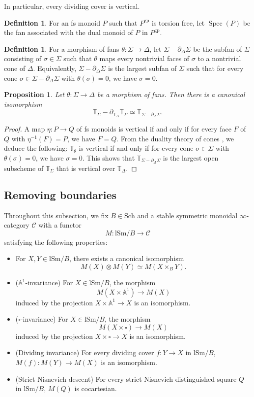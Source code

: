 \documentclass[10pt]{amsart}
\newtheorem{prop}[thm]{Proposition}
\theoremstyle{definition}
\newtheorem{df}[thm]{Definition}
\theoremstyle{remark}
\numberwithin{equation}{subsection}
\newcommand{\A}{\mathbb{A}}
\newcommand{\T}{\mathbb{T}}
\newcommand{\cC}{\mathcal{C}}
\DeclareMathOperator{\Spec}{Spec}
\newcommand{\boxx}{\square}
\newcommand{\Sch}{\mathrm{Sch}}
\newcommand{\lSm}{\mathrm{lSm}}
\newcommand{\gp}{\mathrm{gp}}
\begin{document}
In particular,
every dividing cover is vertical.


\begin{df}
For an fs monoid $P$ such that $P^\gp$ is torsion free, let $\Spec(P)$ be the fan associated with the dual monoid of $P$ in $P^\gp$.
\end{df}



\begin{df}
\label{vert.11}
For a morphism of fans $\theta\colon \Sigma\to \Delta$,
let $\Sigma-\partial_{\Delta}\Sigma$ be the subfan of $\Sigma$ consisting of $\sigma\in \Sigma$ such that $\theta$ maps every nontrivial faces of $\sigma$ to a nontrivial cone of $\Delta$.
Equivalently, $\Sigma-\partial_{\Delta}\Sigma$ is the largest subfan of $\Sigma$ such that for every cone $\sigma\in \Sigma-\partial_{\Delta}\Sigma$ with $\theta(\sigma)=0$, we have $\sigma=0$.
\end{df}

\begin{prop}
Let $\theta\colon \Sigma\to \Delta$ be a morphism of fans.
Then there is a canonical isomorphism
\[
\T_\Sigma-\partial_{\T_\Delta}\T_\Sigma
\simeq
\T_{\Sigma-\partial_\Delta \Sigma}.
\]
\end{prop}
\begin{proof}
A map $\eta\colon P\to Q$ of fs monoids is vertical if and only if for every face $F$ of $Q$ with $\eta^{-1}(F)=P$, we have $F=Q$.
From the duality theory of cones \cite[Theorem I.2.3.12(4)]{Ogu}, we deduce the following:
$\T_\theta$ is vertical if and only if for every cone $\sigma\in \Sigma$ with $\theta(\sigma)=0$, we have $\sigma=0$.
This shows that $\T_{\Sigma-\partial_{\Delta}\Sigma}$ is the largest open subscheme of $\T_{\Sigma}$ that is vertical over $\T_\Delta$.
\end{proof}

\subsection{Removing boundaries}
\label{removing}

Throughout this subsection, we fix $B\in \Sch$ and a stable symmetric monoidal $\infty$-category $\cC$ with a functor
\[
M
\colon
\lSm/B \to \cC
\]
satisfying the following properties:
\begin{itemize}
\item For $X,Y\in \lSm/B$, there exists a canonical isomorphism
\[
M(X)\otimes M(Y)
\simeq
M(X\times_B Y).
\]
\item ($\A^1$-invariance) For $X\in \lSm/B$, the morphism
\[
M(X\times \A^1)\to M(X)
\]
induced by the projection $X\times \A^1\to X$ is an isomorphism.
\item ($\boxx$-invariance) For $X\in \lSm/B$, the morphism
\[
M(X\times \boxx)\to M(X)
\]
induced by the projection $X\times \boxx\to X$ is an isomorphism.
\item (Dividing invariance) For every dividing cover $f\colon Y\to X$ in $\lSm/B$, $M(f)\colon M(Y)\to M(X)$ is an isomorphism.
\item (Strict Nisnevich descent) For every strict Nisnevich distinguished square $Q$ in $\lSm/B$, $M(Q)$ is cocartesian.
\end{itemize}
\end{document}
